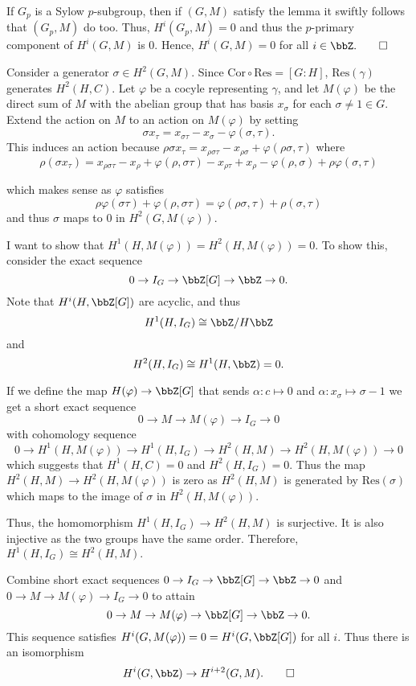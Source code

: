 \documentclass[a4paper, 12pt,oneside,openany]{book}
\begin{document}
If $G_p$ is a Sylow $p$-subgroup, then if $(G, M)$ satisfy the lemma it swiftly follows that $(G_p, M)$ do too. Thus, $H^i(G_p, M)=0$ and thus the $p$-primary component of $H^i(G, M)$ is 0. Hence, $H^i(G, M)=0$ for all $i \in \bbZ. \qed$
 
Consider a generator $\sigma \in H^2(G, M).$ Since $\text{Cor} \circ \text{Res}= [G:H]$, $\text{Res}(\gamma)$ generates $H^2(H, C)$. Let $\varphi$ be a cocyle representing $\gamma$, and let $M(\varphi)$ be the direct sum of $M$ with the abelian group that has basis $x_\sigma$ for each $\sigma \neq 1 \in G$. Extend the action on $M$ to an action on $M(\varphi)$ by setting $$\sigma x_\tau = x_{\sigma \tau}-x_\sigma - \varphi(\sigma, \tau).$$ This induces an action because $\rho \sigma x_\tau = x_{\rho\sigma\tau}-x_{\rho\sigma}+\varphi(\rho\sigma, \tau)$ where $$\rho(\sigma x_\tau) = x_{\rho\sigma\tau}-x_\rho+\varphi(\rho, \sigma\tau)-x_{\rho\tau}+x_\rho-\varphi(\rho, \sigma) + \rho\varphi(\sigma, \tau)$$

which makes sense as $\varphi$ satisfies $$\rho \varphi(\sigma\tau) + \varphi(\rho, \sigma\tau)= \varphi(\rho\sigma, \tau)+\rho(\sigma, \tau)$$ and thus $\sigma$ maps to $0$ in $H^2(G, M(\varphi)).$

I want to show that $H^1(H, M(\varphi)) = H^2(H, M(\varphi))=0$. To show this, consider the exact sequence $$0 \to I_G \to \bbZ[G] \to \bbZ \to 0.$$ Note that $H^i(H, \bbZ[G])$ are acyclic, and thus $$H^1(H, I_G) \cong \bbZ/H\bbZ$$ and $$H^2(H, I_G) \cong H^1(H, \bbZ) =0.$$

If we define the map $H(\varphi) \to \bbZ[G]$ that sends $\alpha: c \mapsto 0$ and $\alpha: x_\sigma \mapsto \sigma-1$ we get a short exact sequence $$0 \to M \to M(\varphi) \to I_G \to 0$$ with cohomology sequence $$0 \to H^1(H, M(\varphi)) \to H^1(H, I_G) \to H^2(H, M) \to H^2(H, M(\varphi)) \to 0$$ which suggests that $H^1(H, C)=0$ and $H^2(H, I_G)=0$. Thus the map $H^2(H, M) \to H^2(H, M(\varphi))$ is zero as $H^2(H, M)$ is generated by $\text{Res}(\sigma)$ which maps to the image of $\sigma$ in $H^2(H, M(\varphi))$. 

Thus, the homomorphism $H^1(H, I_G) \to H^2(H, M)$ is surjective. It is also injective as the two groups have the same order. Therefore, $H^1(H, I_G) \cong H^2(H, M).$

Combine short exact sequences $0 \to I_G \to \bbZ[G] \to \bbZ \to 0$ and  $0 \to M \to M(\varphi) \to I_G \to 0$ to attain $$0 \to M \to M(\varphi) \to \bbZ[G] \to \bbZ \to 0.$$ This sequence satisfies $H^i(G, M(\varphi)) = 0 = H^i(G, \bbZ[G])$ for all $i$. Thus there is an isomorphism $$H^i(G, \bbZ)\to H^{i+2}(G, M). \qed$$
\end{document}
